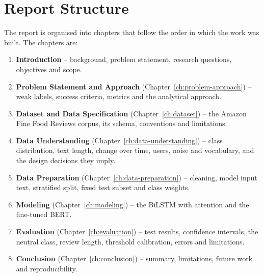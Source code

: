\section{Report Structure}
\label{sec:1-6}

The report is organised into chapters that follow the order in which the work was built. The chapters are:

\begin{enumerate}
    \item \textbf{Introduction} -- background, problem statement, research questions, objectives and scope.
    \item \textbf{Problem Statement and Approach} (Chapter~\ref{ch:problem-approach}) -- weak labels, success criteria, metrics and the analytical approach.
    \item \textbf{Dataset and Data Specification} (Chapter~\ref{ch:dataset}) -- the Amazon Fine Food Reviews corpus, its schema, conventions and limitations.
    \item \textbf{Data Understanding} (Chapter~\ref{ch:data-understanding}) -- class distribution, text length, change over time, users, noise and vocabulary, and the design decisions they imply.
    \item \textbf{Data Preparation} (Chapter~\ref{ch:data-preparation}) -- cleaning, model input text, stratified split, fixed test subset and class weights.
    \item \textbf{Modeling} (Chapter~\ref{ch:modeling}) -- the BiLSTM with attention and the fine-tuned BERT.
    \item \textbf{Evaluation} (Chapter~\ref{ch:evaluation}) -- test results, confidence intervals, the neutral class, review length, threshold calibration, errors and limitations.
    \item \textbf{Conclusion} (Chapter~\ref{ch:conclusion}) -- summary, limitations, future work and reproducibility.
\end{enumerate}
